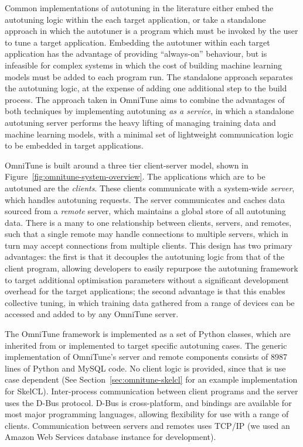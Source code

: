 \documentclass[nonatbib,preprint,9pt]{sigplanconf}
\begin{document}
Common implementations of autotuning in the literature either embed
the autotuning logic within the each target application, %
or take a standalone approach in which the autotuner is a program
which must be invoked by the user to tune a target
application. %
Embedding the autotuner within each target application has the
advantage of providing ``always-on'' behaviour, but is infeasible for
complex systems in which the cost of building machine learning models
must be added to each program run. The standalone approach separates
the autotuning logic, at the expense of adding one additional step to
the build process. The approach taken in OmniTune aims to combine the
advantages of both techniques by implementing autotuning \emph{as a
  service}, in which a standalone autotuning server performs the heavy
lifting of managing training data and machine learning models, with a
minimal set of lightweight communication logic to be embedded in
target applications.

OmniTune is built around a three tier client-server model, shown in
Figure~\ref{fig:omnitune-system-overview}. The applications which are
to be autotuned are the \emph{clients}. These clients communicate with
a system-wide \emph{server}, which handles autotuning requests. The
server communicates and caches data sourced from a \emph{remote}
server, which maintains a global store of all autotuning data. There
is a many to one relationship between clients, servers, and remotes,
such that a single remote may handle connections to multiple servers,
which in turn may accept connections from multiple clients. This
design has two primary advantages: the first is that it decouples the
autotuning logic from that of the client program, allowing developers
to easily repurpose the autotuning framework to target additional
optimisation parameters without a significant development overhead for
the target applications; the second advantage is that this enables
collective tuning, in which training data gathered from a range of
devices can be accessed and added to by any OmniTune server.

The OmniTune framework is implemented as a set of Python classes,
which are inherited from or implemented to target specific autotuning
cases. The generic implementation of OmniTune's server and remote
components consists of 8987 lines of Python and MySQL code. No client
logic is provided, since that is use case dependent (See
Section~\ref{sec:omnitune-skelcl} for an example implementation for
SkelCL). Inter-process communication between client programs and the
server uses the D-Bus protocol. D-Bus is cross-platform, and bindings
are available for most major programming languages, allowing
flexibility for use with a range of clients. Communication between
servers and remotes uses TCP/IP (we used an Amazon Web Services
database instance for development).
\end{document}
